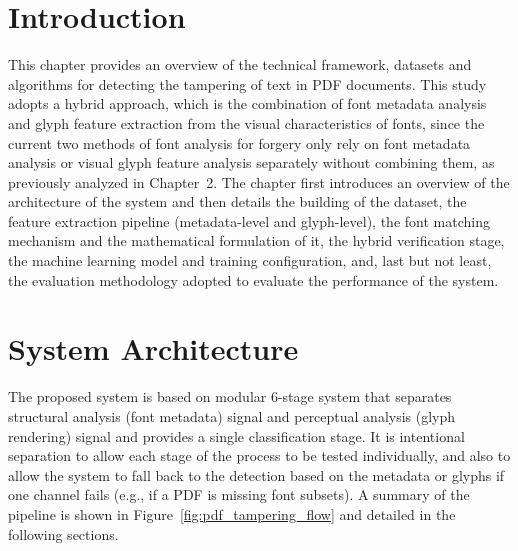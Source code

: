 \section{Introduction}

This chapter provides an overview of the technical framework, datasets and algorithms for detecting the tampering of text in PDF documents. This study adopts a hybrid approach, which is the combination of font metadata analysis and glyph feature extraction from the visual characteristics of fonts, since the current two methods of font analysis for forgery only rely on font metadata analysis or visual glyph feature analysis separately without combining them, as previously analyzed in Chapter~2. The chapter first introduces an overview of the architecture of the system and then details the building of the dataset, the feature extraction pipeline (metadata-level and glyph-level), the font matching mechanism and the mathematical formulation of it, the hybrid verification stage, the machine learning model and training configuration, and, last but not least, the evaluation methodology adopted to evaluate the performance of the system.

\section{System Architecture}

The proposed system is based on modular 6-stage system that separates structural analysis (font metadata) signal and perceptual analysis (glyph rendering) signal and provides a single classification stage. It is intentional separation to allow each stage of the process to be tested individually, and also to allow the system to fall back to the detection based on the metadata or glyphs if one channel fails (e.g., if a PDF is missing font subsets). A summary of the pipeline is shown in Figure~\ref{fig:pdf_tampering_flow} and detailed in the following sections.

